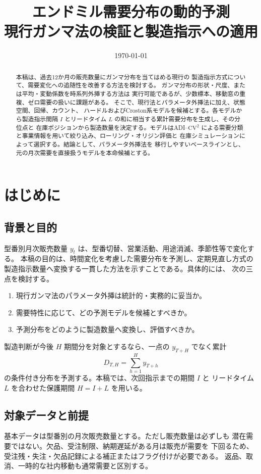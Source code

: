 \documentclass[a4paper,11pt]{jsarticle}
\title{エンドミル需要分布の動的予測\\\large 現行ガンマ法の検証と製造指示への適用}
\author{}\date{\today}
\begin{document}
\maketitle
\begin{abstract}
本稿は、過去12か月の販売数量にガンマ分布を当てはめる現行の
製造指示方式について、需要変化への追随性を改善する方法を検討する。
ガンマ分布の形状・尺度、または平均・変動係数を時系列外挿する方法は
実行可能であるが、少数標本、移動窓の重複、ゼロ需要の扱いに課題がある。
そこで、現行法とパラメータ外挿法に加え、状態空間、回帰、カウント、
ハードルおよびCroston系モデルを候補とする。各モデルから製造指示間隔
$I$ とリードタイム $L$ の和に相当する累計需要分布を生成し、その分位点と
在庫ポジションから製造数量を決定する。モデルはADI--$\mathrm{CV}^2$
による需要分類と事業情報を用いて絞り込み、ローリング・オリジン評価と
在庫シミュレーションによって選択する。結論として、パラメータ外挿法を
移行しやすいベースラインとし、元の月次需要を直接扱うモデルを本命候補とする。
\end{abstract}

\section{はじめに}
\subsection{背景と目的}
型番別月次販売数量 $y_t$ は、型番切替、営業活動、用途消滅、季節性等で変化する。
本稿の目的は、時間変化を考慮した需要分布を予測し、定期見直し方式の
製造指示数量へ変換する一貫した方法を示すことである。具体的には、
次の三点を検討する。
\begin{enumerate}
\item 現行ガンマ法のパラメータ外挿は統計的・実務的に妥当か。
\item 需要特性に応じて、どの予測モデルを候補とすべきか。
\item 予測分布をどのように製造数量へ変換し、評価すべきか。
\end{enumerate}

製造判断が今後 $H$ 期間分を対象とするなら、一点の $y_{T+H}$ でなく累計
\[
D_{T,H}=\sum_{h=1}^{H}y_{T+h}
\]
の条件付き分布を予測する。本稿では、次回指示までの期間 $I$ と
リードタイム $L$ を合わせた保護期間 $H=I+L$ を用いる。

\subsection{対象データと前提}
基本データは型番別の月次販売数量とする。ただし販売数量は必ずしも
潜在需要ではない。欠品、受注制限、納期遅延がある月は販売が需要を
下回るため、受注残・失注・欠品記録による補正またはフラグ付けが必要である。
返品、取消、一時的な社内移動も通常需要と区別する。
\end{document}
